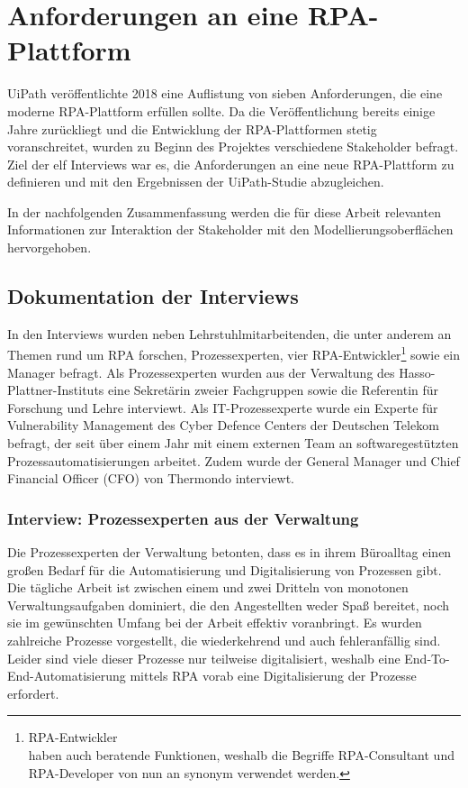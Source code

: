 \section{Anforderungen an eine RPA-Plattform} \label{anforderungsanalyse}

UiPath veröffentlichte 2018 eine Auflistung \cite{uiPathReq} von sieben Anforderungen, die eine moderne RPA-Plattform erfüllen sollte. Da die Veröffentlichung bereits einige Jahre zurückliegt und die Entwicklung der RPA-Plattformen stetig voranschreitet, wurden zu Beginn des Projektes verschiedene Stakeholder befragt. Ziel der elf Interviews war es, die Anforderungen an eine neue RPA-Plattform zu definieren und mit den Ergebnissen der UiPath-Studie abzugleichen. 

In der nachfolgenden Zusammenfassung werden die für diese Arbeit relevanten Informationen zur Interaktion der Stakeholder mit den Modellierungsoberflächen hervorgehoben.

\subsection{Dokumentation der Interviews}
\label{interviews}

In den Interviews wurden neben Lehrstuhlmitarbeitenden, die unter anderem an Themen rund um RPA forschen, Prozessexperten, vier RPA-Entwickler\footnote{RPA-Entwickler \\ haben auch beratende Funktionen, weshalb die Begriffe RPA-Consultant und RPA-Developer von nun an synonym verwendet werden.} sowie ein Manager befragt. Als Prozessexperten wurden aus der Verwaltung des Hasso-Plattner-Instituts eine Sekretärin zweier Fachgruppen sowie die Referentin für Forschung und Lehre interviewt. Als IT-Prozessexperte wurde ein Experte für Vulnerability Management des Cyber Defence Centers der Deutschen Telekom befragt, der seit über einem Jahr mit einem externen Team an softwaregestützten Prozessautomatisierungen arbeitet. Zudem wurde der General Manager und Chief Financial Officer (CFO) von Thermondo interviewt.

\clearpage
\subsubsection{Interview: Prozessexperten aus der Verwaltung}
Die Prozessexperten der Verwaltung betonten, dass es in ihrem Büroalltag einen großen Bedarf für die Automatisierung und Digitalisierung von Prozessen gibt. Die tägliche Arbeit ist zwischen einem und zwei Dritteln von monotonen Verwaltungsaufgaben dominiert, die den Angestellten weder Spaß bereitet, noch sie im gewünschten Umfang bei der Arbeit effektiv voranbringt. Es wurden zahlreiche Prozesse vorgestellt, die wiederkehrend und auch fehleranfällig sind. Leider sind viele dieser Prozesse nur teilweise digitalisiert, weshalb eine End-To-End-Automatisierung mittels RPA vorab eine Digitalisierung der Prozesse erfordert.

